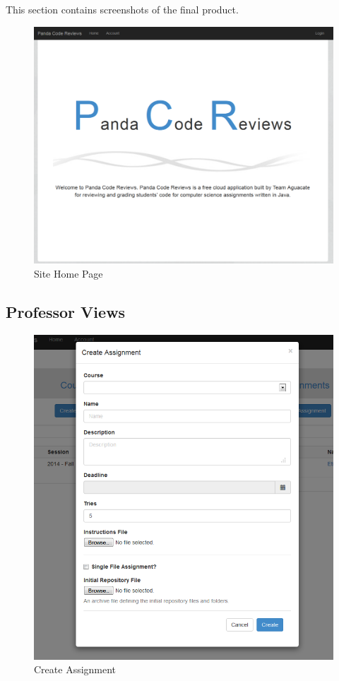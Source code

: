\label{sec:screenshots}

This section contains screenshots of the final product.

\begin{figure}[H]
	\centering
	\includegraphics[width=\textwidth]{img/home-screen}
	\caption{Site Home Page}
\end{figure}

\subsection{Professor Views}

\begin{figure}[H]
	\centering
	\includegraphics[width=\textwidth]{img/createassign-screen}
	\caption{Create Assignment}
\end{figure}

